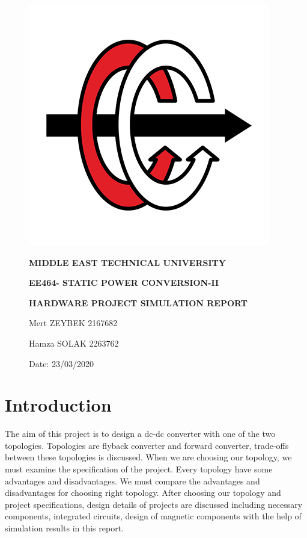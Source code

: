 \documentclass{article}
\date{}
\newcommand\tab[1][1cm]{\hspace*{#1}}
\begin{document}
\begin{figure}[!tp]
\vspace{-10mm}
\includegraphics[scale=0.8]{ee.png}


\vfil
\hfil \Large \bf MIDDLE EAST TECHNICAL UNIVERSITY
 \hfil
\vfil

\vspace{5mm}
\vfil
\hfil \large \bf  EE464- STATIC POWER CONVERSION-II
 \hfil
\vfil

\vspace{5mm}
\vfil
\hfil \large \bf HARDWARE PROJECT SIMULATION REPORT \hfil
\vfil
\bf

\vspace{23mm}
Mert ZEYBEK    \tab\tab 2167682


Hamza SOLAK \tab\tab2263762


\vspace{5mm}
\small Date: 23/03/2020


\end{figure}

\newpage
\tab\tab
\section*{Introduction}
The aim of this project is to design a dc-dc converter with one of the two topologies. Topologies are flyback converter and forward converter, trade-offs between these topologies is discussed. When we are choosing our topology, we must examine the specification of the project. Every topology have some advantages and disadvantages. We must compare the advantages and disadvantages for choosing right topology. 
\newline \tab After choosing our topology and project specifications, design details of projects are discussed including necessary components, integrated circuits, design of magnetic components with the help of simulation results in this report.
\end{document}
